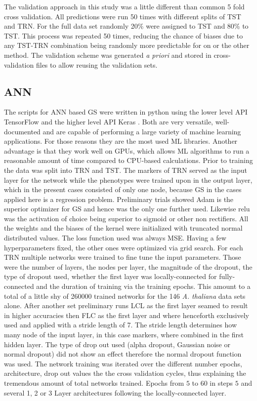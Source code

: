 The validation approach in this study was a little different than common 5 fold cross validation. All
predictions were run 50 times with different splits of TST and TRN. For the full data set randomly 20\% were
assigned to TST and 80\% to TST. This process was repeated 50 times, reducing the chance of biases due to any
TST-TRN combination being randomly more predictable for on or the other method. The validation scheme was
generated \textit{a priori} and stored in cross-validation files to allow reusing the validation sets.


\subsection{ANN}
The scripts for ANN based GS were written in python using the lower level API TensorFlow \cite{TF2016} and the
higher level API Keras \cite{keras2015}. Both are very versatile, well-documented and are capable of
performing a large variety of machine learning applications. For those reasons they are the most used ML
libraries. Another advantage is that they work well on GPUs, which allows ML algorithms to run a reasonable
amount of time compared to CPU-based calculations. Prior to training the data was split into TRN and TST. The
markers of TRN served as the input layer for the network while the phenotypes were trained upon in the output
layer, which in the present cases consisted of only one node, because GS in the cases applied here is a
regression problem. Preliminary trials showed Adam is the superior optimizer for GS and hence was the only
one further used. Likewise relu was the activation of choice being superior to sigmoid or other non
rectifiers. All the weights and the biases of the kernel were initialized with truncated normal distributed
values. The loss function used was always MSE. \newline Having a few hyperparameters fixed, the other ones
were optimized via grid search. For each TRN multiple networks were trained to fine tune the input
parameters. Those were the number of layers, the nodes per layer, the magnitude of the dropout, the type of
dropout used, whether the first layer was locally-connected for fully-connected and the duration of training
via the training epochs. This amount to a total of a little shy of 260000 trained networks for the 146
\textit{A. thaliana} data sets alone. \newline After another set preliminary runs LCL as the first layer
seamed to result in higher accuracies then FLC as the first layer and where henceforth exclusively used and
applied with a stride length of 7. The stride length determines how many node of the input layer, in this case
markers, where combined in the first hidden layer. The type of drop out used (alpha dropout, Gaussian noise
or normal dropout) did not show an effect therefore the normal dropout function was used. The network
training was iterated over the different number epochs, architecture, drop out values the the cross validation
cycles, thus explaining the tremendous amount of total networks trained. Epochs from $5$ to $60$ in steps $5$
and several 1, 2 or 3 Layer architectures following the locally-connected layer.

